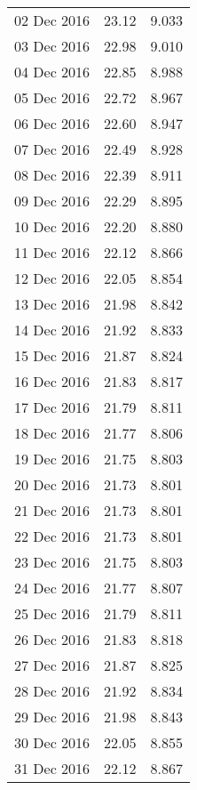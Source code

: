 \documentclass[11pt,a4paper,twoside]{article}
\begin{document}
\begin{longtable}{lcc}
02 Dec 2016                    & 23.12                & 9.033      \\
03 Dec 2016                    & 22.98                & 9.010      \\
04 Dec 2016                    & 22.85                & 8.988      \\
05 Dec 2016                    & 22.72                & 8.967      \\
06 Dec 2016                    & 22.60                & 8.947      \\
07 Dec 2016                    & 22.49                & 8.928      \\
08 Dec 2016                    & 22.39                & 8.911      \\
09 Dec 2016                    & 22.29                & 8.895      \\
10 Dec 2016                    & 22.20                & 8.880      \\
11 Dec 2016                    & 22.12                & 8.866      \\
12 Dec 2016                    & 22.05                & 8.854      \\
13 Dec 2016                    & 21.98                & 8.842      \\
14 Dec 2016                    & 21.92                & 8.833      \\
15 Dec 2016                    & 21.87                & 8.824      \\
16 Dec 2016                    & 21.83                & 8.817      \\
17 Dec 2016                    & 21.79                & 8.811      \\
18 Dec 2016                    & 21.77                & 8.806      \\
19 Dec 2016                    & 21.75                & 8.803      \\
20 Dec 2016                    & 21.73                & 8.801      \\
21 Dec 2016                    & 21.73                & 8.801      \\
22 Dec 2016                    & 21.73                & 8.801      \\
23 Dec 2016                    & 21.75                & 8.803      \\
24 Dec 2016                    & 21.77                & 8.807      \\
25 Dec 2016                    & 21.79                & 8.811      \\
26 Dec 2016                    & 21.83                & 8.818      \\
27 Dec 2016                    & 21.87                & 8.825      \\
28 Dec 2016                    & 21.92                & 8.834      \\
29 Dec 2016                    & 21.98                & 8.843      \\
30 Dec 2016                    & 22.05                & 8.855      \\
31 Dec 2016                    & 22.12                & 8.867      \\ %
\end{longtable}
\end{document}
